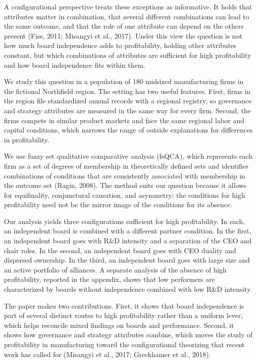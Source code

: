 \documentclass[11pt]{article}
\begin{document}
A configurational perspective treats these exceptions as informative. It holds that attributes matter in combination, that several different combinations can lead to the same outcome, and that the role of one attribute can depend on the others present (Fiss, 2011; Misangyi et al., 2017). Under this view the question is not how much board independence adds to profitability, holding other attributes constant, but which combinations of attributes are sufficient for high profitability and how board independence fits within them.

We study this question in a population of 180 midsized manufacturing firms in the fictional Northfield region. The setting has two useful features. First, firms in the region file standardized annual records with a regional registry, so governance and strategy attributes are measured in the same way for every firm. Second, the firms compete in similar product markets and face the same regional labor and capital conditions, which narrows the range of outside explanations for differences in profitability.

We use fuzzy set qualitative comparative analysis (fsQCA), which represents each firm as a set of degrees of membership in theoretically defined sets and identifies combinations of conditions that are consistently associated with membership in the outcome set (Ragin, 2008). The method suits our question because it allows for equifinality, conjunctural causation, and asymmetry: the conditions for high profitability need not be the mirror image of the conditions for its absence.

Our analysis yields three configurations sufficient for high profitability. In each, an independent board is combined with a different partner condition. In the first, an independent board goes with R\&D intensity and a separation of the CEO and chair roles. In the second, an independent board goes with CEO duality and dispersed ownership. In the third, an independent board goes with large size and an active portfolio of alliances. A separate analysis of the absence of high profitability, reported in the appendix, shows that low performers are characterized by boards without independence combined with low R\&D intensity.

The paper makes two contributions. First, it shows that board independence is part of several distinct routes to high profitability rather than a uniform lever, which helps reconcile mixed findings on boards and performance. Second, it shows how governance and strategy attributes combine, which moves the study of profitability in manufacturing toward the configurational theorizing that recent work has called for (Misangyi et al., 2017; Greckhamer et al., 2018).
\end{document}
